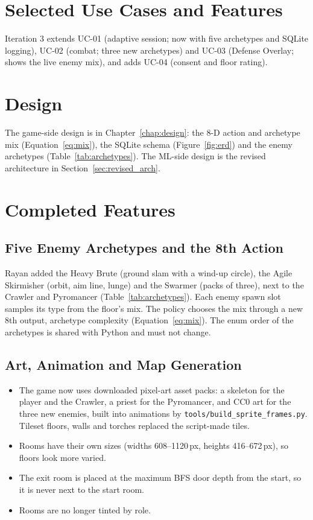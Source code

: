 \section{Selected Use Cases and Features}
Iteration 3 extends UC-01 (adaptive session; now with five archetypes and SQLite logging), UC-02 (combat; three new archetypes) and UC-03 (Defense Overlay; shows the live enemy mix), and adds UC-04 (consent and floor rating).

\section{Design}
The game-side design is in Chapter~\ref{chap:design}: the 8-D action and archetype mix (Equation~\ref{eq:mix}), the SQLite schema (Figure~\ref{fig:erd}) and the enemy archetypes (Table~\ref{tab:archetypes}). The ML-side design is the revised architecture in Section~\ref{sec:revised_arch}.

\section{Completed Features}
\label{sec:iter3_features}

\subsection{Five Enemy Archetypes and the 8th Action}
Rayan added the Heavy Brute (ground slam with a wind-up circle), the Agile Skirmisher (orbit, aim line, lunge) and the Swarmer (packs of three), next to the Crawler and Pyromancer (Table~\ref{tab:archetypes}). Each enemy spawn slot samples its type from the floor's mix. The policy chooses the mix through a new 8th output, archetype complexity (Equation~\ref{eq:mix}). The enum order of the archetypes is shared with Python and must not change.

\subsection{Art, Animation and Map Generation}
\begin{itemize}
    \item The game now uses downloaded pixel-art asset packs: a skeleton for the player and the Crawler, a priest for the Pyromancer, and CC0 art for the three new enemies, built into animations by \texttt{tools/build\_sprite\_frames.py}. Tileset floors, walls and torches replaced the script-made tiles.
    \item Rooms have their own sizes (widths 608--1120\,px, heights 416--672\,px), so floors look more varied.
    \item The exit room is placed at the maximum BFS door depth from the start, so it is never next to the start room.
    \item Rooms are no longer tinted by role.
\end{itemize}

